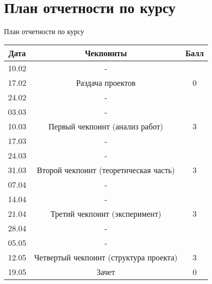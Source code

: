 \documentclass[10pt,pdf,hyperref={unicode}]{beamer}
\begin{document}
\section{План отчетности по курсу}
\begin{frame}{План отчетности по курсу}
\bigskip
\begin{table}[]
\begin{tabular}{|c|c|c|}
\hline
Дата  & Чекпоинты                              & Балл \\ \hline
10.02 & -                                      &      \\ \hline
17.02 & Раздача проектов                       & 0    \\ \hline
24.02 & -                                      &      \\ \hline
03.03 & -                                      &      \\ \hline
10.03 & Первый чекпоинт (анализ работ)         & 3    \\ \hline
17.03 & -                                      &      \\ \hline
24.03 & -                                      &      \\ \hline
31.03 & Второй чекпоинт (теоретическая часть)  & 3    \\ \hline
07.04 & -                                      &      \\ \hline
14.04 & -                                      &      \\ \hline
21.04 & Третий чекпоинт (эксперимент)          & 3    \\ \hline
28.04 & -                                      &      \\ \hline
05.05 & -                                      &      \\ \hline
12.05 & Четвертый чекпоинт (структура проекта) & 3    \\ \hline
19.05 & Зачет                                  & 0    \\ \hline
\end{tabular}
\end{table}
\end{frame}

\end{document}
